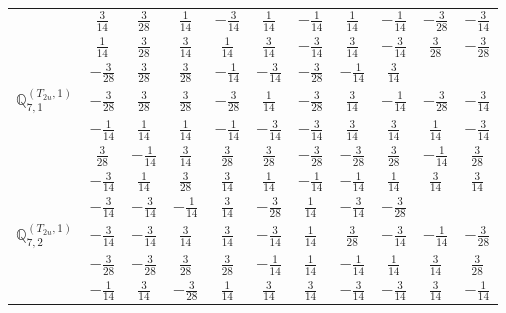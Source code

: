\documentclass[fleqn,10pt,landscape]{article}
\begin{document}
\begin{itemize}
{\begin{center}
\begin{longtable}{ccccccccccc}
& $ \frac{3}{14} $ & $ \frac{3}{28} $ & $ \frac{1}{14} $ & $ - \frac{3}{14} $ & $ \frac{1}{14} $ & $ - \frac{1}{14} $ & $ \frac{1}{14} $ & $ - \frac{1}{14} $ & $ - \frac{3}{28} $ & $ - \frac{3}{14} $ \\
& $ \frac{1}{14} $ & $ \frac{3}{28} $ & $ \frac{3}{14} $ & $ \frac{1}{14} $ & $ \frac{3}{14} $ & $ - \frac{3}{14} $ & $ \frac{3}{14} $ & $ - \frac{3}{14} $ & $ \frac{3}{28} $ & $ - \frac{3}{28} $ \\
& $ - \frac{3}{28} $ & $ \frac{3}{28} $ & $ \frac{3}{28} $ & $ - \frac{1}{14} $ & $ - \frac{3}{14} $ & $ - \frac{3}{28} $ & $ - \frac{1}{14} $ & $ \frac{3}{14} $ & $  $ & $  $ \\ \hline
$\mathbb{Q}_{7,1}^{(T_{2u},1)}$ & $ - \frac{3}{28} $ & $ \frac{3}{28} $ & $ \frac{3}{28} $ & $ - \frac{3}{28} $ & $ \frac{1}{14} $ & $ - \frac{3}{28} $ & $ \frac{3}{14} $ & $ - \frac{1}{14} $ & $ - \frac{3}{28} $ & $ - \frac{3}{14} $ \\
& $ - \frac{1}{14} $ & $ \frac{1}{14} $ & $ \frac{1}{14} $ & $ - \frac{1}{14} $ & $ - \frac{3}{14} $ & $ - \frac{3}{14} $ & $ \frac{3}{14} $ & $ \frac{3}{14} $ & $ \frac{1}{14} $ & $ - \frac{3}{14} $ \\
& $ \frac{3}{28} $ & $ - \frac{1}{14} $ & $ \frac{3}{14} $ & $ \frac{3}{28} $ & $ \frac{3}{28} $ & $ - \frac{3}{28} $ & $ - \frac{3}{28} $ & $ \frac{3}{28} $ & $ - \frac{1}{14} $ & $ \frac{3}{28} $ \\
& $ - \frac{3}{14} $ & $ \frac{1}{14} $ & $ \frac{3}{28} $ & $ \frac{3}{14} $ & $ \frac{1}{14} $ & $ - \frac{1}{14} $ & $ - \frac{1}{14} $ & $ \frac{1}{14} $ & $ \frac{3}{14} $ & $ \frac{3}{14} $ \\
& $ - \frac{3}{14} $ & $ - \frac{3}{14} $ & $ - \frac{1}{14} $ & $ \frac{3}{14} $ & $ - \frac{3}{28} $ & $ \frac{1}{14} $ & $ - \frac{3}{14} $ & $ - \frac{3}{28} $ & $  $ & $  $ \\ \hline
$\mathbb{Q}_{7,2}^{(T_{2u},1)}$ & $ - \frac{3}{14} $ & $ - \frac{3}{14} $ & $ \frac{3}{14} $ & $ \frac{3}{14} $ & $ - \frac{3}{14} $ & $ \frac{1}{14} $ & $ \frac{3}{28} $ & $ - \frac{3}{14} $ & $ - \frac{1}{14} $ & $ - \frac{3}{28} $ \\
& $ - \frac{3}{28} $ & $ - \frac{3}{28} $ & $ \frac{3}{28} $ & $ \frac{3}{28} $ & $ - \frac{1}{14} $ & $ \frac{1}{14} $ & $ - \frac{1}{14} $ & $ \frac{1}{14} $ & $ \frac{3}{14} $ & $ \frac{3}{28} $ \\
& $ - \frac{1}{14} $ & $ \frac{3}{14} $ & $ - \frac{3}{28} $ & $ \frac{1}{14} $ & $ \frac{3}{14} $ & $ \frac{3}{14} $ & $ - \frac{3}{14} $ & $ - \frac{3}{14} $ & $ \frac{3}{14} $ & $ - \frac{1}{14} $ \\

\end{longtable}
\end{center}}
\end{itemize}
\end{document}
